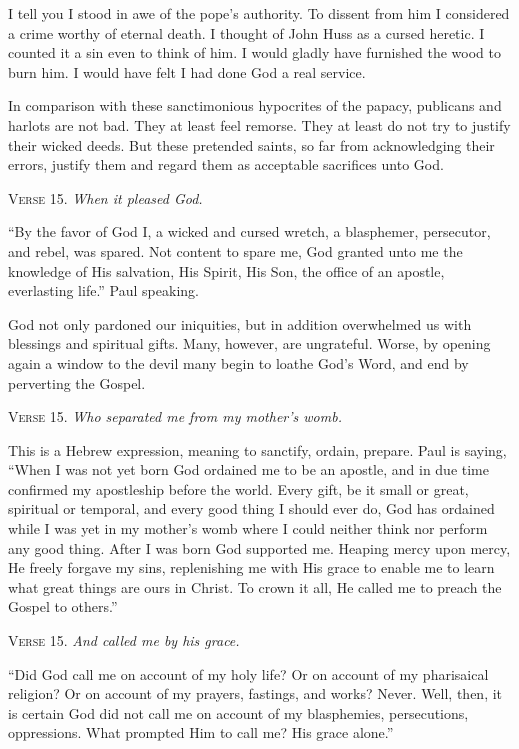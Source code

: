 I tell you I stood in awe of the pope’s authority. To dissent from him I considered a crime worthy of eternal death. I thought of John Huss as a cursed heretic. I counted it a sin even to think of him. I would gladly have furnished the wood to burn him. I would have felt I had done God a real service.

In comparison with these sanctimonious hypocrites of the papacy, publicans and harlots are not bad. They at least feel remorse. They at least do not try to justify their wicked deeds. But these pretended saints, so far from acknowledging their errors, justify them and regard them as acceptable sacrifices unto God.

\textsc{Verse} 15. \emph{When it pleased God.}

“By the favor of God I, a wicked and cursed wretch, a blasphemer, persecutor, and rebel, was spared. Not content to spare me, God granted unto me the knowledge of His salvation, His Spirit, His Son, the office of an apostle, everlasting life.” Paul speaking.

God not only pardoned our iniquities, but in addition overwhelmed us with blessings and spiritual gifts. Many, however, are ungrateful. Worse, by opening again a window to the devil many begin to loathe God’s Word, and end by perverting the Gospel.

\textsc{Verse} 15. \emph{Who separated me from my mother’s womb.}

This is a Hebrew expression, meaning to sanctify, ordain, prepare. Paul is saying, “When I was not yet born God ordained me to be an apostle, and in due time confirmed my apostleship before the world. Every gift, be it small or great, spiritual or temporal, and every good thing I should ever do, God has ordained while I was yet in my mother’s womb where I could neither think nor perform any good thing. After I was born God supported me. Heaping mercy upon mercy, He freely forgave my sins, replenishing me with His grace to enable me to learn what great things are ours in Christ. To crown it all, He called me to preach the Gospel to others.”

\textsc{Verse} 15. \emph{And called me by his grace.}

“Did God call me on account of my holy life? Or on account of my pharisaical religion? Or on account of my prayers, fastings, and works? Never. Well, then, it is certain God did not call me on account of my blasphemies, persecutions, oppressions. What prompted Him to call me? His grace alone.”

